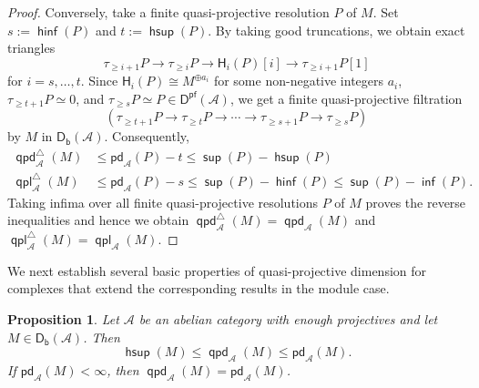 \documentclass[10pt, a4paper,reqno]{amsart}
\newtheorem{prop}[prop]{Proposition}
\theoremstyle{definition}
\theoremstyle{remark}
\numberwithin{equation}{thm}
\def\cA{\mathcal{A}}
\def\sH{\mathsf{H}}
\def\Db{\mathsf{D_b}}
\def\Pf{\mathsf{D^{pf}}}
\def\sup{\operatorname{\mathsf{sup}}}
\def\hsup{\operatorname{\mathsf{hsup}}}
\def\inf{\operatorname{\mathsf{inf}}}
\def\hinf{\operatorname{\mathsf{hinf}}}
\def\pd{\mathsf{pd}}
\def\qpd{\operatorname{\mathsf{qpd}}}
\def\qpl{\operatorname{\mathsf{qpl}}}
\begin{document}
\begin{proof}
Conversely, take a finite quasi-projective resolution $P$ of $M$.
Set $s:= \hinf(P)$ and $t := \hsup(P)$.
By taking good truncations, we obtain exact triangles
\[
\tau_{\ge i+1}P \to \tau_{\ge i}P \to \sH_i(P)[i] \to \tau_{\ge i+1}P[1]
\]
for $i = s,\ldots,t$.
Since $\sH_i(P) \cong M^{\oplus a_i}$ for some non-negative integers $a_i$, $\tau_{\ge t+1}P \simeq 0$, and $\tau_{\ge s}P \simeq P \in \Pf(\cA)$, we get a finite quasi-projective filtration
\[
(\tau_{\ge t+1}P \to \tau_{\ge t}P \to \cdots \to \tau_{\ge s+1}P \to \tau_{\ge s}P)
\]
by $M$ in $\Db(\cA)$.
Consequently,
\begin{align*}
\qpd_\cA^\triangle(M) &\le \pd_\cA(P) -t \le \sup(P) - \hsup(P) \\
\qpl_\cA^\triangle(M) &\le \pd_\cA(P) -s \le \sup(P) - \hinf(P) \le \sup(P) - \inf(P).
\end{align*}
Taking infima over all finite quasi-projective resolutions $P$ of $M$ proves the reverse inequalities and hence we obtain $\qpd_\cA^\triangle(M) = \qpd_\cA(M)$ and $\qpl_\cA^\triangle(M) = \qpl_\cA(M)$.
\end{proof}


We next establish several basic properties of quasi-projective dimension for complexes that extend the corresponding results in the module case.

\begin{prop}\label{pd-qpd}
Let $\cA$ be an abelian category with enough projectives and let $M\in\Db(\cA)$.
Then
\[
\hsup(M) \le \qpd_\cA(M) \le \pd_\cA(M).
\]
If $\pd_\cA(M)<\infty$, then $\qpd_\cA(M)=\pd_\cA(M)$.
\end{prop}
\end{document}
